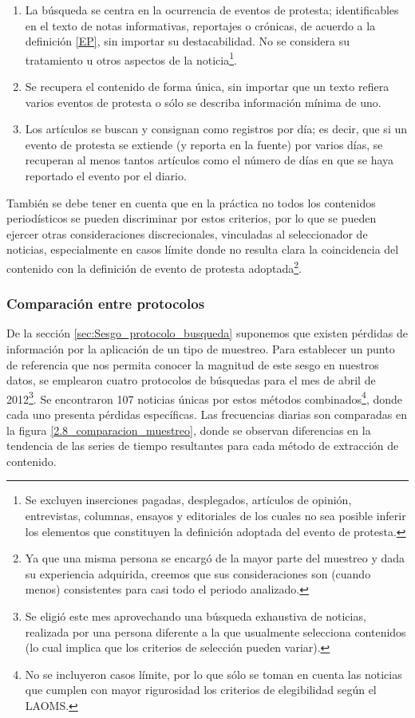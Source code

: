 \documentclass[letterpaper, 11pt]{book}
\theoremstyle{definition}
\theoremstyle{remark}
\begin{document}
\begin{enumerate}
    \item La búsqueda se centra en la ocurrencia de eventos de protesta; identificables en el texto de notas informativas, reportajes o crónicas, de acuerdo a la definición \ref{EP}, sin importar su destacabilidad. No se considera su tratamiento u otros aspectos de la noticia\footnote{Se excluyen inserciones pagadas, desplegados, artículos de opinión, entrevistas, columnas, ensayos y editoriales de los cuales no sea posible inferir los elementos que constituyen la definición adoptada del evento de protesta.}.
    \item Se recupera el contenido de forma única, sin importar que un texto refiera varios eventos de protesta o sólo se describa información mínima de uno.
    \item Los artículos se buscan y consignan como registros por día; es decir, que si un evento de protesta se extiende (y reporta en la fuente) por varios días, se recuperan al menos tantos artículos como el número de días en que se haya reportado el evento por el diario.
\end{enumerate}

También se debe tener en cuenta que en la práctica no todos los contenidos periodísticos se pueden discriminar por estos criterios, por lo que se pueden ejercer otras consideraciones discrecionales, vinculadas al seleccionador de noticias, especialmente en casos límite donde no resulta clara la coincidencia del contenido con la definición de evento de protesta adoptada\footnote{
    Ya que una misma persona se encargó de la mayor parte del muestreo y dada su experiencia adquirida, creemos que sus consideraciones son (cuando menos) consistentes para casi todo el periodo analizado.
}.





\subsubsection{Comparación entre protocolos}
\label{sec:NotiMuestreo_ComparacionProtocolos}

De la sección \ref{sec:Sesgo_protocolo_busqueda} suponemos que existen pérdidas de información por la aplicación de un tipo de muestreo. 
Para establecer un punto de referencia que nos permita conocer la magnitud de este sesgo en nuestros datos, se emplearon cuatro protocolos de búsquedas para el mes de abril de 2012\footnote{
    Se eligió este mes aprovechando una búsqueda exhaustiva de noticias, realizada por una persona diferente a la que usualmente selecciona contenidos (lo cual implica que los criterios de selección pueden variar).
}. 
Se encontraron 107 noticias únicas por estos métodos combinados\footnote{
    No se incluyeron casos límite, por lo que sólo se toman en cuenta las noticias que cumplen con mayor rigurosidad los criterios de elegibilidad según el LAOMS.
}, 
donde cada uno presenta pérdidas específicas. 
Las frecuencias diarias son comparadas en la figura \ref{2.8_comparacion_muestreo}, donde se observan diferencias en la tendencia de las series de tiempo resultantes para cada método de extracción de contenido. 
\end{document}
